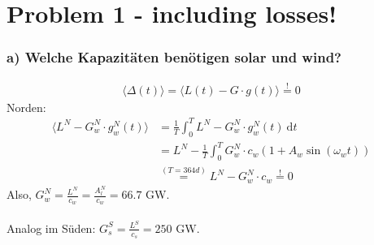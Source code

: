 \documentclass[12pt]{article}
\begin{document}
\section*{Problem 1 - including losses!}

\subsubsection*{a) Welche Kapazitäten ben\"otigen solar und wind?}
\begin{align*}
	\langle \Delta (t) \rangle = \langle L(t) - G \cdot g(t) \rangle \overset{!}{=} 0
\end{align*}
Norden:
\begin{align*}
	\langle L^N - G^N_w\cdot g_w^N(t)\rangle &=\frac{1}{T} \int_0^T L^N - G_w^N \cdot g_w^N(t) \ \mathrm{d}t \\
	&=L^N - \frac{1}{T} \int_0^T G_w^N\cdot c_w \left(1+A_w\sin{\left(\omega_wt\right)}\right)\\
	&\overset{(T=364d)}{=} L^N - G_w^N \cdot c_w \overset{!}{=} 0
\end{align*}
Also, $G_w^N = \frac{L^N}{c_w} = \frac{A_l^N}{c_w} = 66.7$ GW.\\
\ \\
Analog im S\"uden: $G_s^S = \frac{L^S}{c_s} = 250$ GW.
\end{document}
